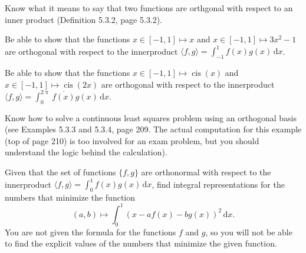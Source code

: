 \documentclass[12pt,fleqn]{exam}
\DeclareMathOperator{\cis}{cis}
\begin{document}
\begin{questions}

\item Know what it means to say that two functions are orthgonal with respect to an inner product (Definition 5.3.2, page 5.3.2).

\item Be able to show that the functions $x  \in [-1,1] \mapsto x$ and $x \in [-1,1] \mapsto  3 x^2 - 1$ are orthogonal
with respect to the innerproduct $\langle f, g \rangle = \int_{-1}^1 f(x) g(x) \, \mathrm{d} x$.

\item Be able to show that the functions $x  \in [-1,1] \mapsto \cis(x) $ and $x \in [-1,1] \mapsto  \cis(2 x)$ are orthogonal
with respect to the innerproduct $\langle f, g \rangle = \int_{0}^{2 \uppi} \overline{f(x)} g(x) \, \mathrm{d} x$.

\item Know how to solve a continuous least squares problem using an orthogonal basis (see Examples 5.3.3 and 5.3.4, page 209. The actual computation for this example (top of page 210) is too involved for an exam problem, but you should 
understand the logic behind the calculation).

\item Given that the set of functions $\{f,g\}$ are orthonormal with respect to the innerproduct $\langle f, g \rangle =
\int_0^1 f(x) g(x) \, \mathrm{d} x$, find integral representations for the numbers that minimize the 
function
\begin{equation*}
   (a,b) \mapsto \int_0^1 \left(x - a f(x) - b g(x) \right)^2 \, \mathrm{d} x.
\end{equation*}
You are not given the formula for the functions $f$ and $g$, so you will not be able to find the explicit values of
the numbers that minimize the given function.


\end{questions}
\end{document}
